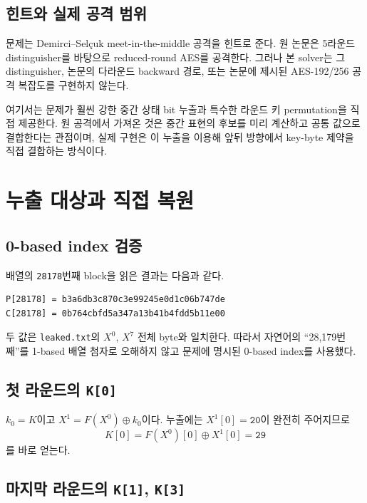 \documentclass[10pt,a4paper]{article}
\begin{document}
\subsection{힌트와 실제 공격 범위}

문제는 Demirci--Selçuk meet-in-the-middle 공격을 힌트로 준다. 원 논문은
5라운드 distinguisher를 바탕으로 reduced-round AES를 공격한다. 그러나
본 solver는 그 distinguisher, 논문의 다라운드 backward 경로, 또는
논문에 제시된 AES-192/256 공격 복잡도를 구현하지 않는다.

여기서는 문제가 훨씬 강한 중간 상태 bit 누출과 특수한 라운드 키
permutation을 직접 제공한다. 원 공격에서 가져온 것은 중간 표현의
후보를 미리 계산하고 공통 값으로 결합한다는 관점이며, 실제 구현은 이
누출을 이용해 앞뒤 방향에서 key-byte 제약을 직접 결합하는 방식이다.

\section{누출 대상과 직접 복원}

\subsection{0-based index 검증}

배열의 \texttt{28178}번째 block을 읽은 결과는 다음과 같다.

\begin{lstlisting}
P[28178] = b3a6db3c870c3e99245e0d1c06b747de
C[28178] = 0b764cbfd5a347a13b41b4fdd5b11e00
\end{lstlisting}

두 값은 \texttt{leaked.txt}의 $X^0$, $X^7$ 전체 byte와 일치한다.
따라서 자연어의 ``28,179번째''를 1-based 배열 첨자로 오해하지 않고
문제에 명시된 0-based index를 사용했다.

\subsection{첫 라운드의 \texttt{K[0]}}

$k_0=K$이고 $X^1=F(X^0)\oplus k_0$이다. 누출에는
$X^1[0]=\texttt{20}$이 완전히 주어지므로
\[
 K[0]=F(X^0)[0]\oplus X^1[0]=\texttt{29}
\]
를 바로 얻는다.

\subsection{마지막 라운드의 \texttt{K[1]}, \texttt{K[3]}}
\end{document}
